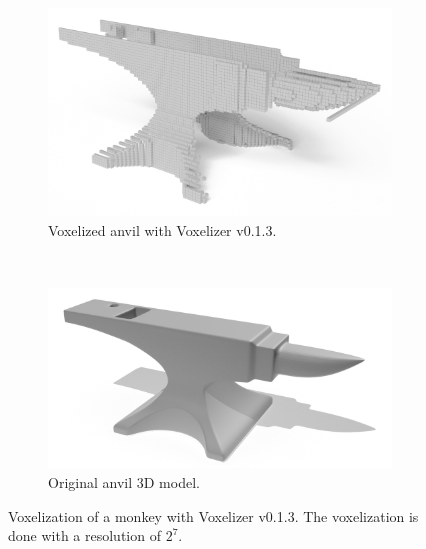 \begin{figure}[p]
    \centering
    \begin{subfigure}[b]{0.7\textwidth}
        \centering
        \includegraphics[width=\textwidth]{sections/theory/figures/voxelizer-v013-anvil-128.png}
        \caption{Voxelized anvil with Voxelizer v0.1.3.}
        \label{fig:voxelizer-v0.1.3-anvil}
    \end{subfigure}
    \\
    \begin{subfigure}[b]{0.7\textwidth}
        \centering
        \includegraphics[width=\textwidth]{sections/theory/figures/anvil.png}
        \caption{Original anvil 3D model.}
        \label{fig:original-anvil}
    \end{subfigure}
    \hfill
    \caption{Voxelization of a monkey with Voxelizer v0.1.3. The voxelization is done with a resolution of $2^7$.}
    \label{fig:voxelizer-v0.1.3-anvil}
\end{figure}